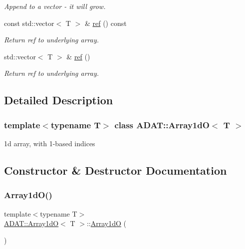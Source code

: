 \begin{DoxyCompactItemize}
\begin{DoxyCompactList}\small\item\em Append to a vector -\/ it will grow. \end{DoxyCompactList}\item 
const std\+::vector$<$ T $>$ \& \mbox{\hyperlink{classADAT_1_1Array1dO_a3b74880db3b0d48e29fb28f80a283352}{ref}} () const
\begin{DoxyCompactList}\small\item\em Return ref to underlying array. \end{DoxyCompactList}\item 
std\+::vector$<$ T $>$ \& \mbox{\hyperlink{classADAT_1_1Array1dO_ac3ff9b35bef8e7fa276136673b907749}{ref}} ()
\begin{DoxyCompactList}\small\item\em Return ref to underlying array. \end{DoxyCompactList}\end{DoxyCompactItemize}


\subsection{Detailed Description}
\subsubsection*{template$<$typename T$>$\newline
class A\+D\+A\+T\+::\+Array1d\+O$<$ T $>$}

1d array, with 1-\/based indices 

\subsection{Constructor \& Destructor Documentation}
\mbox{\label{classADAT_1_1Array1dO_af55d30db029bb654a123544dfc155e6a}} 
\subsubsection{\texorpdfstring{Array1dO()}{Array1dO()}\hspace{0.1cm}{\footnotesize\ttfamily [1/10]}}
{\footnotesize\ttfamily template$<$typename T$>$ \\
\mbox{\hyperlink{classADAT_1_1Array1dO}{A\+D\+A\+T\+::\+Array1dO}}$<$ T $>$\+::\mbox{\hyperlink{classADAT_1_1Array1dO}{Array1dO}} (\begin{DoxyParamCaption}{ }\end{DoxyParamCaption})\hspace{0.3cm}{\ttfamily [inline]}}

